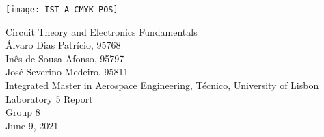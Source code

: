 
\thispagestyle {empty}

\texttt{[image: IST\_A\_CMYK\_POS]}

\begin{center}
%
\vspace{1.0cm}

\vspace{1cm}
{\FontLb Circuit Theory and Electronics Fundamentals} \\ %
\vspace{1.0cm}
{\FontSn Álvaro Dias Patrício, 95768} \\
\vspace{0.5cm}
{\FontSn Inês de Sousa Afonso, 95797} \\
\vspace{0.5cm}
{\FontSn José Severino Medeiro, 95811} \\
\vspace{1.0cm}
{\FontSn Integrated Master in Aerospace Engineering, Técnico, University of Lisbon} \\ %
\vspace{1.0cm}
{\FontSn Laboratory 5 Report} \\
\vspace{0.5cm}
{\FontSn Group 8} \\
\vspace{1.0cm}
{\FontSn June 9, 2021} \\ %
%
\end{center}

